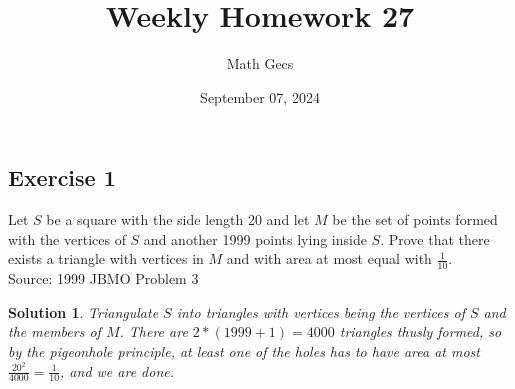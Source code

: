 \documentclass[12pt]{article}
\title{Weekly Homework 27}
\author{Math Gecs}
\date{September 07, 2024}
\newtheorem*{solution*}{Solution}
\begin{document}
\maketitle

\subsection*{Exercise 1}
Let $S$ be a square with the side length 20 and let $M$ be the set of points formed with the vertices of $S$ and another 1999 points lying inside $S$. Prove that there exists a triangle with vertices in $M$ and with area at most equal with $\frac 1{10}$.\\

Source: 1999 JBMO Problem 3\\


\begin{solution*}
Triangulate $S$ into triangles with vertices being the vertices of $S$ and the members of $M$. There are $2*(1999 + 1) = 4000$ triangles thusly formed, so by the pigeonhole principle, at least one of the holes has to have area at most $\frac{20^2}{4000} = \frac{1}{10}$, and we are done.
\end{solution*}
\end{document}
